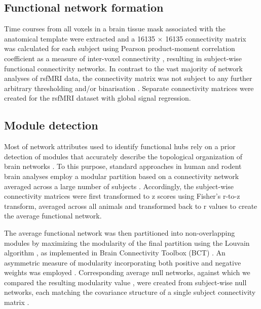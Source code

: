 \subsection{Functional network formation}
Time courses from all voxels in a brain tissue mask associated with the
anatomical template  were extracted and a 16135 $\times$ 16135 connectivity
matrix was calculated for each subject using Pearson product-moment correlation
coefficient as a measure of inter-voxel connectivity \parencite{bullmore2009},
resulting in subject-wise functional connectivity networks. In contrast to the
vast majority of network analyses of rsfMRI data, the connectivity matrix was
not subject to any further arbitrary thresholding and/or binarisation
\parencite{bullmore2009}. Separate connectivity matrices were created for the
rsfMRI dataset with global signal regression.

\subsection{Module detection}
Most of network attributes used to identify functional hubs rely on a prior
detection of modules that accurately describe the topological organization of
brain networks \parencite{sporns2013}. To this purpose, standard approaches in
human and rodent brain analyses employ a modular partition based on a
connectivity network averaged across a large number of subjects
\parencite{dsouza2014, liang2011, liang2012, mechling2014, power2011, power2013,
rubinov2010, yeo2011,  zuo2012}. Accordingly, the subject-wise connectivity
matrices were first transformed to z scores using Fisher’s r-to-z transform,
averaged across all animals and transformed back to r values to create the
average functional network. 

The average functional network was then partitioned into non-overlapping modules
by maximizing the modularity of the final partition \parencite{newman2004} using
the Louvain algorithm \parencite{blondel2008}, as implemented in Brain
Connectivity Toolbox (BCT) \parencite{rubinov2010}. An asymmetric measure of
modularity incorporating both positive and negative weights was employed
\parencite{rubinov2011}. Corresponding average null networks, against which we
compared the resulting modularity value \parencite{guimera2004}, were created
from subject-wise null networks, each matching the covariance structure of a
single subject connectivity matrix \parencite{zalesky2012}.

